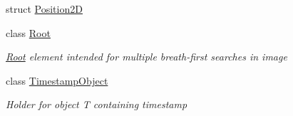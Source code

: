 \begin{DoxyCompactItemize}
\item 
struct \mbox{\hyperlink{struct_chess_tracking_1_1_utils_1_1_position2_d}{Position2D}}
\item 
class \mbox{\hyperlink{class_chess_tracking_1_1_utils_1_1_root}{Root}}
\begin{DoxyCompactList}\small\item\em \mbox{\hyperlink{class_chess_tracking_1_1_utils_1_1_root}{Root}} element intended for multiple breath-\/first searches in image \end{DoxyCompactList}\item 
class \mbox{\hyperlink{class_chess_tracking_1_1_utils_1_1_timestamp_object}{Timestamp\+Object}}
\begin{DoxyCompactList}\small\item\em Holder for object T containing timestamp \end{DoxyCompactList}\end{DoxyCompactItemize}
